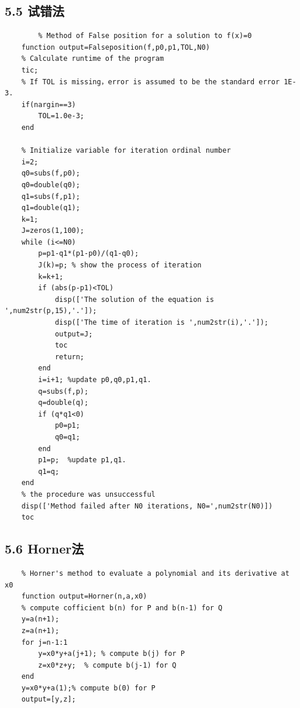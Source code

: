 \documentclass{article}
\begin{document}
    \subsection{5.5 试错法}
    \begin{lstlisting}
        % Method of False position for a solution to f(x)=0
    function output=Falseposition(f,p0,p1,TOL,N0)
    % Calculate runtime of the program
    tic;
    % If TOL is missing，error is assumed to be the standard error 1E-3.
    if(nargin==3)
        TOL=1.0e-3;
    end 

    % Initialize variable for iteration ordinal number 
    i=2;
    q0=subs(f,p0);
    q0=double(q0);
    q1=subs(f,p1);
    q1=double(q1);
    k=1;
    J=zeros(1,100);
    while (i<=N0)
        p=p1-q1*(p1-p0)/(q1-q0);
        J(k)=p; % show the process of iteration
        k=k+1;
        if (abs(p-p1)<TOL)
            disp(['The solution of the equation is ',num2str(p,15),'.']);
            disp(['The time of iteration is ',num2str(i),'.']);
            output=J;
            toc
            return;
        end
        i=i+1; %update p0,q0,p1,q1.
        q=subs(f,p);
        q=double(q);
        if (q*q1<0)
            p0=p1;
            q0=q1;
        end
        p1=p;  %update p1,q1.
        q1=q;
    end
    % the procedure was unsuccessful
    disp(['Method failed after N0 iterations, N0=',num2str(N0)])
    toc
    \end{lstlisting}

    \subsection{5.6 Horner法}
    \begin{lstlisting}
    % Horner's method to evaluate a polynomial and its derivative at x0
    function output=Horner(n,a,x0)
    % compute cofficient b(n) for P and b(n-1) for Q
    y=a(n+1);
    z=a(n+1);
    for j=n-1:1
        y=x0*y+a(j+1); % compute b(j) for P
        z=x0*z+y;  % compute b(j-1) for Q
    end
    y=x0*y+a(1);% compute b(0) for P
    output=[y,z];
    \end{lstlisting}
\end{document}
